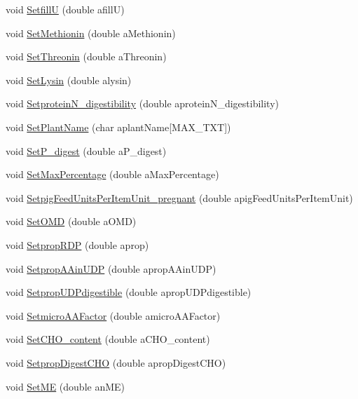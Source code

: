 \begin{DoxyCompactItemize}
\item 
void \hyperlink{classfeed_item_af6ad7e93e9036dfb34a73c3232546d72}{SetfillU} (double afillU)
\item 
void \hyperlink{classfeed_item_a460189522e05438ac2c087df40434cd5}{SetMethionin} (double aMethionin)
\item 
void \hyperlink{classfeed_item_a66652abe6fd0ac478fc8f8fa62afb3b1}{SetThreonin} (double aThreonin)
\item 
void \hyperlink{classfeed_item_a8dd468e3cf1562e32c18f31363d4c3ea}{SetLysin} (double alysin)
\item 
void \hyperlink{classfeed_item_a6cea7c9bd1b2134a9714675e01b0c9f8}{SetproteinN\_\-digestibility} (double aproteinN\_\-digestibility)
\item 
void \hyperlink{classfeed_item_a09e4df6c141127dba83ca18d0878e0d3}{SetPlantName} (char aplantName\mbox{[}MAX\_\-TXT\mbox{]})
\item 
void \hyperlink{classfeed_item_a8f08fb0fa5aa998baec8cc09dda96f3e}{SetP\_\-digest} (double aP\_\-digest)
\item 
void \hyperlink{classfeed_item_aef50d0ad2fdb85bd962dfe5ee4fc5c4b}{SetMaxPercentage} (double aMaxPercentage)
\item 
void \hyperlink{classfeed_item_ab1d2af37391e40833af70b55b1ca6daf}{SetpigFeedUnitsPerItemUnit\_\-pregnant} (double apigFeedUnitsPerItemUnit)
\item 
void \hyperlink{classfeed_item_a18ed185e5691256001dbe832b2acea08}{SetOMD} (double aOMD)
\item 
void \hyperlink{classfeed_item_a2d4b61ce89e7e04f22c4454a63c0ed40}{SetpropRDP} (double aprop)
\item 
void \hyperlink{classfeed_item_a5cf127a6895d93e2a0ad370211693762}{SetpropAAinUDP} (double apropAAinUDP)
\item 
void \hyperlink{classfeed_item_ab36494c4378cdf496b70c9e92a5aeb40}{SetpropUDPdigestible} (double apropUDPdigestible)
\item 
void \hyperlink{classfeed_item_ab31be1d8bbd2be4fc1b96824e093306e}{SetmicroAAFactor} (double amicroAAFactor)
\item 
void \hyperlink{classfeed_item_aa50c44b1683a7dfb89f4af3b89cc8a84}{SetCHO\_\-content} (double aCHO\_\-content)
\item 
void \hyperlink{classfeed_item_a402e160cb67531d01d55621e7fab8c9b}{SetpropDigestCHO} (double apropDigestCHO)
\item 
void \hyperlink{classfeed_item_a524a9bf0c873bd9a420c3d66f837d005}{SetME} (double anME)

\end{DoxyCompactItemize}
